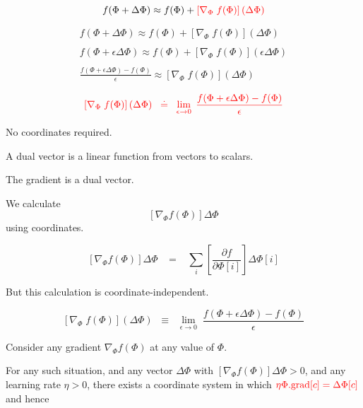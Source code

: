 {\vfill
$$f(\Phi + \Delta\Phi) \approx f(\Phi) + {\color{red} \left[\nabla_\Phi \;f(\Phi)\right](\Delta \Phi)}$$


\begin{eqnarray*}
f(\Phi + \Delta\Phi) \approx f(\Phi) + \left[\nabla_\Phi \;f(\Phi)\right](\Delta \Phi) \\
\\
f(\Phi + \epsilon \Delta\Phi) \approx f(\Phi) + \left[\nabla_\Phi \;f(\Phi)\right](\epsilon \Delta \Phi) \\
\\
\frac{f(\Phi + \epsilon \Delta\Phi) - f(\Phi)}{\epsilon} \approx \left[\nabla_\Phi \;f(\Phi)\right](\Delta \Phi)
\end{eqnarray*}

\vfill

$${\color{red} \left[\nabla_\Phi\; f(\Phi)\right](\Delta \Phi) \;\;\doteq\;\; \lim_{\epsilon \rightarrow 0} \; \frac{f(\Phi + \epsilon \Delta \Phi) - f(\Phi)}{\epsilon}}$$

\vfill
No coordinates required.


A dual vector is a linear function from vectors to scalars.

\vfill
The gradient is a dual vector.


We calculate $$\left[\nabla_\Phi f(\Phi)\right]\Delta \Phi$$  using coordinates.

$$\left[\nabla_\Phi f(\Phi)\right]\Delta \Phi \;\;\;=\;\;\; \sum_i \left[\frac{\partial f}{\partial \Phi[i]}\right] \Delta \Phi[i]$$

\vfill
But this calculation is coordinate-independent.

\vfill
$$\left[\nabla_\Phi\; f(\Phi)\right](\Delta \Phi) \;\;\equiv\;\; \lim_{\epsilon \rightarrow 0} \; \frac{f(\Phi + \epsilon \Delta \Phi) - f(\Phi)}{\epsilon}$$


Consider any gradient $\nabla_\Phi f(\Phi)$ at any value of $\Phi$.

\vfill
For any such situation, and {\color{red} any vector $\Delta \Phi$} with $\left[\nabla_\Phi f(\Phi)\right] \Delta \Phi > 0$,
and {\color{red} any learning rate $\eta > 0$},
{\color{red} there exists a coordinate system} in which ${\color{red} \eta \Phi.\mathrm{grad}[c] = \Delta \Phi[c]}$ and hence

}
